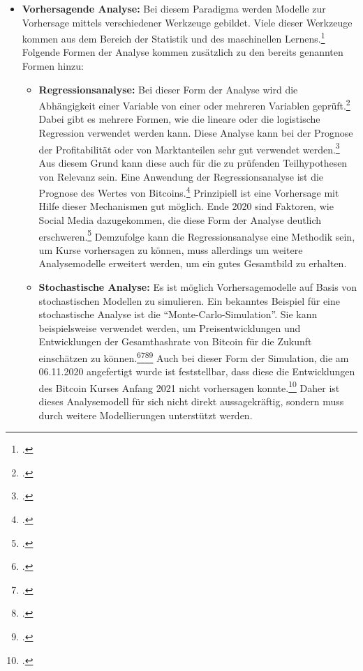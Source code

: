 \begin{itemize}
    \item \textbf{Vorhersagende Analyse: }Bei diesem Paradigma werden Modelle zur Vorhersage mittels verschiedener Werkzeuge
    gebildet. Viele dieser Werkzeuge kommen aus dem Bereich der Statistik und des maschinellen
    Lernens.\footcite[Vgl.][Abb. 1]{bihani2014comparative} Folgende Formen der Analyse kommen zusätzlich zu den bereits
    genannten Formen hinzu:
    \begin{itemize}
        \item \textbf{Regressionsanalyse: }Bei dieser Form der Analyse wird die Abhängigkeit einer Variable von einer oder
        mehreren Variablen geprüft.\footcite[Vgl.][S. 97f]{bihani2014comparative} Dabei gibt es mehrere Formen, wie die lineare
        oder die logistische Regression verwendet werden kann. Diese Analyse kann bei der Prognose der Profitabilität
        oder von Marktanteilen sehr gut verwendet werden.\footcite[Vgl.][S. 99]{bihani2014comparative} Aus diesem Grund kann
        diese auch für die zu prüfenden Teilhypothesen von Relevanz sein. Eine Anwendung der
        Regressionsanalyse ist die Prognose des Wertes von Bitcoins.\footcite[Vgl.][S. 19]{ibrahim2020bitcoin} Prinzipiell
        ist eine Vorhersage mit Hilfe dieser Mechanismen gut möglich. Ende 2020 sind Faktoren, wie Social Media dazugekommen,
        die diese Form der Analyse deutlich erschweren.\footcite[Vgl.][]{forbes2021musk} Demzufolge kann die Regressionsanalyse eine
        Methodik sein, um Kurse vorhersagen zu können, muss allerdings um weitere Analysemodelle erweitert werden, um ein gutes
        Gesamtbild zu erhalten. 
        \item \textbf{Stochastische Analyse: }Es ist möglich Vorhersagemodelle auf Basis von stochastischen Modellen zu
        simulieren. Ein bekanntes Beispiel für eine stochastische Analyse ist die "`Monte-Carlo-Simulation"'. Sie kann
        beispielsweise verwendet werden, um Preisentwicklungen und Entwicklungen der Gesamthashrate von Bitcoin für die Zukunft
        einschätzen zu
        können.\footcite[Vgl.][S. 28]{cocco2016modeling}\footcite[Vgl.][]{appendix:mcszenarien}\footcite[Vgl.][]{appendix:mcpreis}\footcite[Vgl.][]{appendix:mchashrate}
        Auch bei dieser Form der Simulation, die am 06.11.2020 angefertigt wurde ist feststellbar, dass diese die Entwicklungen
        des Bitcoin Kurses Anfang 2021 nicht vorhersagen konnte.\footcite[Vgl.][]{appendix:btcusd} Daher ist dieses Analysemodell für sich nicht direkt aussagekräftig,
        sondern muss durch weitere Modellierungen unterstützt werden.
    \end{itemize}


\end{itemize}
